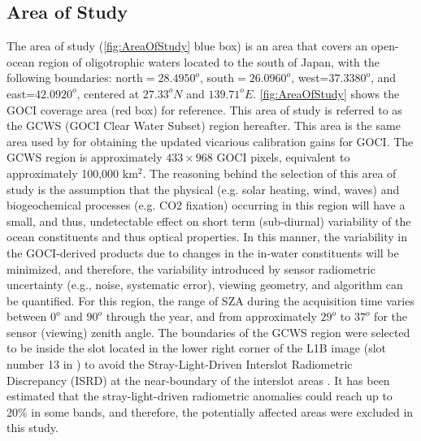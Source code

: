 \documentclass[remotesensing,article,submit,moreauthors,pdftex,10pt,a4paper]{Definitions/mdpi}
\begin{document}
\subsection{Area of Study}
The area of study (\autoref{fig:AreaOfStudy} blue box) is an area that covers an open-ocean region of oligotrophic waters located to the south of Japan, with the following boundaries: north$=28.4950^o$, south$=26.0960^o$, west=$ 37.3380^o$, and east=$ 42.0920^o$, centered at $27.33^oN$ and $139.71^oE$. \autoref{fig:AreaOfStudy} shows the GOCI coverage area (red box) for reference. This area of study is referred to as the GCWS (GOCI Clear Water Subset) region hereafter. This area is the same area used by \cite{Concha_2018a} for obtaining the updated vicarious calibration gains for GOCI. The GCWS region is approximately $433\times968$ GOCI pixels, equivalent to approximately 100,000 km$^2$. The reasoning behind the selection of this area of study is the assumption that the physical (e.g. solar heating, wind, waves) and biogeochemical processes (e.g. CO2 fixation) occurring in this region will have a small, and thus, undetectable effect on short term (sub-diurnal) variability of the ocean constituents and thus optical properties. In this manner, the variability in the GOCI-derived products due to changes in the in-water constituents will be minimized, and therefore, the variability introduced by sensor radiometric uncertainty (e.g., noise, systematic error), viewing geometry, and algorithm can be quantified. For this region, the range of SZA during the acquisition time varies between $0^o$ and $90^o$ through the year, and from approximately $29^o$ to $37^o$ for the sensor (viewing) zenith angle. The boundaries of the GCWS region were selected to be inside the slot located in the lower right corner of the L1B image (slot number 13 in \cite{Kim:2015}) to avoid the Stray-Light-Driven Interslot Radiometric Discrepancy (ISRD) at the near-boundary of the interslot areas \cite{Kim:2015,Kim:2016}. It has been estimated that the stray-light-driven radiometric anomalies could reach up to 20\% in some bands, and therefore, the potentially affected areas were excluded in this study. 
\end{document}
